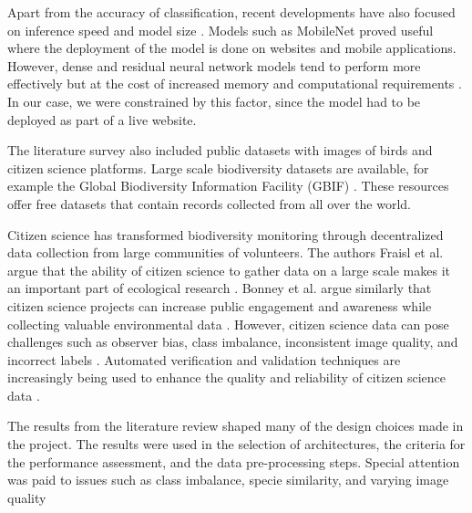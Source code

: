 Apart from the accuracy of classification, recent developments have also focused on
inference speed and model size \cite{lolge2025evolution, tang2025comparative}.
Models such as MobileNet proved useful where the deployment of the model is done
on websites and mobile applications. However, dense and residual neural network models
tend to perform more effectively but at the cost of increased memory and computational
requirements \cite{bilgin2022bird}. In our case, we were constrained by this factor,
since the model had to be deployed as part of a live website.

The literature survey also included public datasets with images of birds and citizen science platforms. 
Large scale biodiversity datasets are available, for example the Global Biodiversity Information Facility (GBIF) \cite{gbif2025}. 
These resources offer free datasets that contain records collected from all over the world.

Citizen science has transformed biodiversity monitoring through decentralized data collection from large communities of volunteers.
The authors Fraisl et al. argue that the ability of citizen science to gather data on a large scale makes it an important part of ecological research \cite{fraisl2022citizen}.
Bonney et al. argue similarly that citizen science projects can increase public engagement and awareness while collecting valuable environmental data \cite{bonney2015citizen}. 
However, citizen science data can pose challenges such as observer bias, class imbalance, inconsistent image quality, and incorrect labels \cite{johnston2022outstanding}.
Automated verification and validation techniques are increasingly being used to enhance the quality and reliability of citizen science data \cite{baker2021verification}.

The results from the literature review shaped many of the design choices made in the project.
The results were used in the selection of architectures, the criteria for the performance assessment, and the data pre-processing steps.
Special attention was paid to issues such as class imbalance, specie similarity, and varying image quality

\clearpage